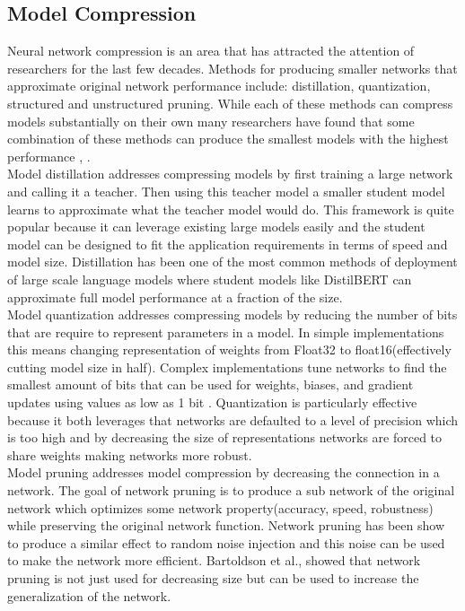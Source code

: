 \documentclass[sigplan,screen]{acmart}
\begin{document}
\subsection{Model Compression}
Neural network compression is an area that has attracted the attention of researchers for the last few decades. Methods for producing smaller networks that approximate original network performance include: distillation, quantization, structured and unstructured pruning. While each of these methods can compress models substantially on their own many researchers have found that some combination of these methods can produce the smallest models with the highest performance \cite{Polino2018ModelCV}, \cite{Sanh2020MovementPA}. \\
Model distillation \cite{Ba2014DoDN} addresses compressing models by first training a large network and calling it a teacher. Then using this teacher model a smaller student model learns to approximate what the teacher model would do. This framework is quite popular because it can leverage existing large models easily and the student model can be designed to fit the application requirements in terms of speed and model size. Distillation has been one of the most common methods of deployment of large scale language models where student models like DistilBERT \cite{Sanh2019DistilBERTAD} can approximate full model performance at a fraction of the size. \\
Model quantization \cite{Gong2014CompressingDC} \cite{Han2016DeepCC} addresses compressing models by reducing the number of bits that are require to represent parameters in a model. In simple implementations this means changing representation of weights from Float32 to float16(effectively cutting model size in half). Complex implementations tune networks to find the smallest amount of bits that can be used for weights, biases, and gradient updates using values as low as 1 bit \cite{Courbariaux2016BinarizedNN}. Quantization is particularly effective because it both leverages that networks are defaulted to a level of precision which is too high and by decreasing the size of representations networks are forced to share weights making networks more robust. \\
Model pruning \cite{LeCun1989OptimalBD} addresses model compression by decreasing the connection in a network. The goal of network pruning is to produce a sub network of the original network which optimizes some network property(accuracy, speed, robustness) while preserving the original network function. Network pruning has been show to produce a similar effect to random noise injection \cite{Bartoldson2019TheGT} and this noise can be used to make the network more efficient. Bartoldson et al., showed that network pruning is not just used for decreasing size but can be used to increase the generalization of the network. 
\end{document}
